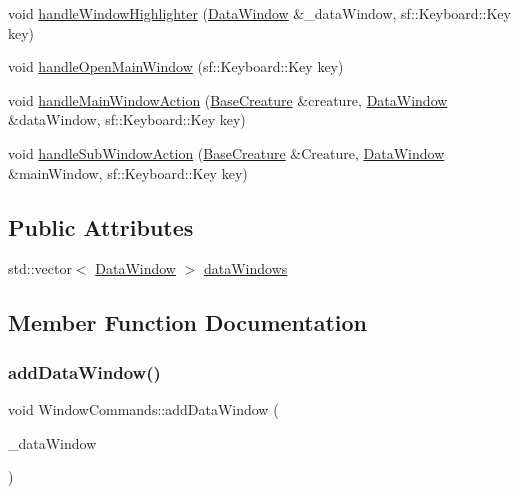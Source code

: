 \begin{DoxyCompactItemize}
\item 
void \mbox{\hyperlink{class_window_commands_a579bde80c82ababdcdbf271ccefd30b5}{handle\+Window\+Highlighter}} (\mbox{\hyperlink{class_data_window}{Data\+Window}} \&\+\_\+data\+Window, sf\+::\+Keyboard\+::\+Key key)
\item 
void \mbox{\hyperlink{class_window_commands_a9b124a88e3af586738fe6b3cbce6fda2}{handle\+Open\+Main\+Window}} (sf\+::\+Keyboard\+::\+Key key)
\item 
void \mbox{\hyperlink{class_window_commands_ac4a64479853dfa15653a7690403815b7}{handle\+Main\+Window\+Action}} (\mbox{\hyperlink{class_base_creature}{Base\+Creature}} \&creature, \mbox{\hyperlink{class_data_window}{Data\+Window}} \&data\+Window, sf\+::\+Keyboard\+::\+Key key)
\item 
void \mbox{\hyperlink{class_window_commands_a1c45c8c693e631b581eeb355176a49e7}{handle\+Sub\+Window\+Action}} (\mbox{\hyperlink{class_base_creature}{Base\+Creature}} \&Creature, \mbox{\hyperlink{class_data_window}{Data\+Window}} \&main\+Window, sf\+::\+Keyboard\+::\+Key key)
\end{DoxyCompactItemize}
\subsection*{Public Attributes}
\begin{DoxyCompactItemize}
\item 
std\+::vector$<$ \mbox{\hyperlink{class_data_window}{Data\+Window}} $>$ \mbox{\hyperlink{class_window_commands_aaa04e997ba5d2b2042cbe565c80cafbb}{data\+Windows}}
\end{DoxyCompactItemize}


\subsection{Member Function Documentation}
\mbox{\label{class_window_commands_ace8d243ff05f6535d2c6fe5bff6e5517}} 
\subsubsection{\texorpdfstring{add\+Data\+Window()}{addDataWindow()}}
{\footnotesize\ttfamily void Window\+Commands\+::add\+Data\+Window (\begin{DoxyParamCaption}\item[{\mbox{\hyperlink{class_data_window}{Data\+Window}}}]{\+\_\+data\+Window }\end{DoxyParamCaption})}

